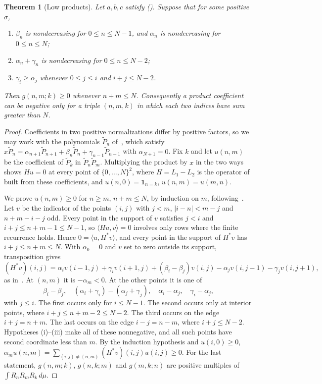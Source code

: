 \documentclass[twoside,10pt]{article}
\numberwithin{equation}{section}
\theoremstyle{slbody}
\newtheorem{theorem}{Theorem}[section]
\theoremstyle{definition}
\theoremstyle{remark}
\renewcommand{\eqref}[1]{\textup{{\normalfont(\oldstylenums{\ref{#1}}}\normalfont)}}
\begin{document}
\begin{theorem}[Low products]\label{thm:low}
Let $a,b,c$ satisfy \eqref{eq:basic}. Suppose that for some positive $\sigma$,
\begin{enumerate}
\item $\beta_n$ is nondecreasing for $0\leq n\leq N-1$, and $\alpha_n$ is nondecreasing for $0\leq n\leq N$;
\item $\alpha_n+\gamma_n$ is nondecreasing for $0\leq n\leq N-2$;
\item $\gamma_i\geq\alpha_j$ whenever $0\leq j\leq i$ and $i+j\leq N-2$.
\end{enumerate}
Then $g(n,m;k)\geq0$ whenever $n+m\leq N$. Consequently a product coefficient can be negative only for a triple $(n,m,k)$ in which each two indices have sum greater than $N$.
\end{theorem}
\begin{proof}
Coefficients in two positive normalizations differ by positive factors, so we may work with the polynomials $\widetilde P_n$ of~\cite[(3.9)]{szwarc}, which satisfy $x\widetilde P_n=\alpha_{n+1}\widetilde P_{n+1}+\beta_n\widetilde P_n+\gamma_{n-1}\widetilde P_{n-1}$ with $\alpha_{N+1}=0$. Fix $k$ and let $u(n,m)$ be the coefficient of $\widetilde P_k$ in $\widetilde P_n\widetilde P_m$. Multiplying the product by $x$ in the two ways shows $Hu=0$ at every point of $\{0,\ldots,N\}^2$, where $H=L_1-L_2$ is the operator of~\cite[\S3.4]{szwarc} built from these coefficients, and $u(n,0)=\boldsymbol1_{n=k}$, $u(n,m)=u(m,n)$.

We prove $u(n,m)\geq0$ for $n\geq m$, $n+m\leq N$, by induction on $m$, following~\cite[Theorem~3.4]{szwarc}. Let $v$ be the indicator of the points $(i,j)$ with $j<m$, $|i-n|<m-j$ and $n+m-i-j$ odd. Every point in the support of $v$ satisfies $j<i$ and $i+j\leq n+m-1\leq N-1$, so $\langle Hu,v\rangle=0$ involves only rows where the finite recurrence holds. Hence $0=\langle u,H^*v\rangle$, and every point in the support of $H^*v$ has $i+j\leq n+m\leq N$. With $\alpha_0=0$ and $v$ set to zero outside its support, transposition gives
\[
(H^*v)(i,j)=\alpha_iv(i-1,j)+\gamma_iv(i+1,j)+(\beta_i-\beta_j)v(i,j)-\alpha_jv(i,j-1)-\gamma_jv(i,j+1),
\]
as in~\cite[\S3.4]{szwarc}. At $(n,m)$ it is $-\alpha_m<0$. At the other points it is one of
\[
\beta_i-\beta_j,\quad (\alpha_i+\gamma_i)-(\alpha_j+\gamma_j),\quad \alpha_i-\alpha_j,\quad \gamma_i-\alpha_j,
\]
with $j\leq i$. The first occurs only for $i\leq N-1$. The second occurs only at interior points, where $i+j\leq n+m-2\leq N-2$. The third occurs on the edge $i+j=n+m$. The last occurs on the edge $i-j=n-m$, where $i+j\leq N-2$. Hypotheses (i)--(iii) make all of these nonnegative, and all such points have second coordinate less than $m$. By the induction hypothesis and $u(i,0)\geq0$, $\alpha_mu(n,m)=\sum_{(i,j)\neq(n,m)}(H^*v)(i,j)u(i,j)\geq0$. For the last statement, $g(n,m;k)$, $g(n,k;m)$ and $g(m,k;n)$ are positive multiples of $\int R_nR_mR_k\,d\mu$.
\end{proof}
\end{document}

